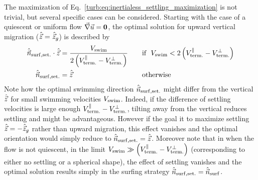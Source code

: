 The maximization of Eq.~\eqref{turb:eq:inertialess_settling_maximization} is not trivial, but several specific cases can be considered.
Starting with the case of a quiescent or uniform flow $\vec{\nabla} \vec{u} = \boldsymbol{0}$, the optimal solution for upward vertical migration ($\hat{\vec{z}} = \hat{\vec{z}}_g$) is described by
\begin{subequations}
	\begin{align}
		\hat{\vec{n}}_{\mathrm{surf, set.}} \cdot \hat{\vec{z}} &= \frac{V_{\mathrm{swim}}}{2 \left( V_{\mathrm{term.}}^\parallel - V_{\mathrm{term.}}^\perp \right)} \quad &&\text{if} ~~ V_{\mathrm{swim}} < 2 \left( V_{\mathrm{term.}}^\parallel - V_{\mathrm{term.}}^\perp \right) \\
		\hat{\vec{n}}_{\mathrm{surf, set.}} &= \hat{\vec{z}} &&\text{otherwise}
	\end{align}
\end{subequations}
Note how the optimal swimming direction $\hat{\vec{n}}_{\mathrm{surf, set.}}$ might differ from the vertical $\hat{\vec{z}}$ for small swimming velocities $V_{\mathrm{swim}}$.
Indeed, if the difference of settling velocities is large enough $V_{\mathrm{term.}}^\parallel - V_{\mathrm{term.}}^\perp$, tilting away from the vertical reduces settling and might be advantageous.
However if the goal it to maximize settling $\hat{\vec{z}} = -\hat{\vec{z}}_g$ rather than upward migration, this effect vanishes and the optimal orientation would simply reduce to $\hat{\vec{n}}_{\mathrm{surf, set.}} = \hat{\vec{z}}$.
Moreover note that in when the flow is not quiescent, in the limit $V_{\mathrm{swim}} \gg \left( V_{\mathrm{term.}}^\parallel - V_{\mathrm{term.}}^\perp \right)$ (corresponding to either no settling or a spherical shape), the effect of settling vanishes and the optimal solution results simply in the surfing strategy $\hat{\vec{n}}_{\mathrm{surf, set.}} = \hat{\vec{n}}_{\mathrm{surf}}$.

